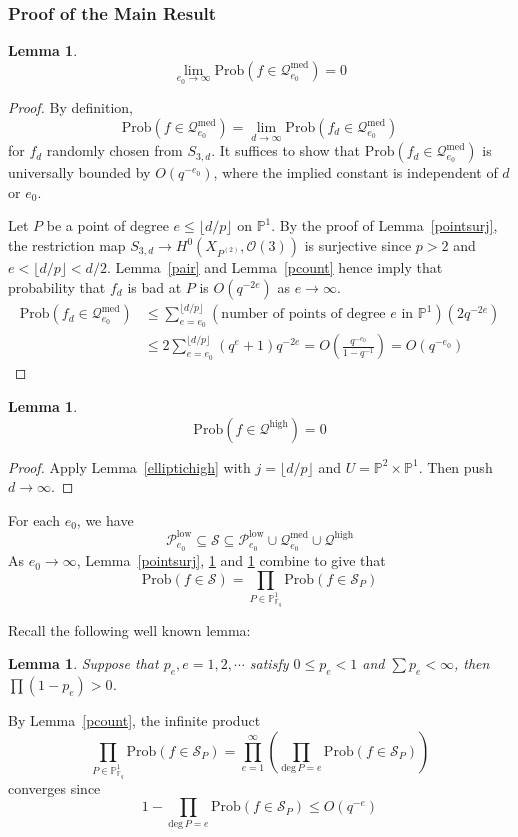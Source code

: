 \documentclass[12pt]{article}
\theoremstyle{plain}
\newtheorem{lemma}[equation]{Lemma}
\theoremstyle{definition}
\newcommand{\IF}{\mathbb{F}}
\newcommand{\IP}{\mathbb{P}}
\newcommand{\sO}{\mathcal{O}}
\newcommand{\sP}{\mathcal{P}}
\newcommand{\sQ}{\mathcal{Q}}
\newcommand{\sS}{\mathcal{S}}
\renewcommand{\deg}{\mathrm{deg}\,}
\newcommand{\<}{\langle}
\renewcommand{\>}{\rangle}
\newcommand{\Prob}{\mathrm{Prob}}
\newcommand{\fl}[1]{\lfloor #1 \rfloor}
\begin{document}
\subsubsection{Proof of the Main Result}
\begin{lemma}
\label{ellipticmed}
$$ \lim_{e_0 \to \infty} \Prob( f \in \sQ_{e_0}^{\mathrm{med}}) = 0 $$
\end{lemma}
\begin{proof}
By definition, 
$$ \Prob( f \in  \sQ_{e_0}^{\mathrm{med}}) = \lim_{d \to \infty} \Prob(f_d \in \sQ_{e_0}^{\mathrm{med}})$$
for $f_d$ randomly chosen from $S_{3, d}$. It suffices to show that $\Prob(f_d \in \sQ_{e_0}^{\mathrm{med}})$ is universally bounded by $O(q^{-e_0})$, where the implied constant is independent of $d$ or $e_0$. 

Let $P$ be a point of degree $e \le \lfloor d/p \rfloor$ on $\IP^1$. By the proof of Lemma~\ref{pointsurj}, the restriction map $S_{3, d} \to H^0(X_{P^{(2)}}, \sO(3))$ is surjective since $p > 2$ and $e < \lfloor d/p \rfloor < d/2$. Lemma~\ref{pair} and Lemma~\ref{pcount} hence imply that probability that $f_d$ is bad at $P$ is $O(q^{-2e})$ as $e \to \infty$. 
\begin{align*}
\Prob(f_d \in \sQ_{e_0}^{\mathrm{med}}) &\le \sum_{e = e_0}^{\lfloor d/p \rfloor} (\text{number of points of degree $e$ in $\IP^1$})(2q^{-2e}) \\
&\le 2 \sum_{e = e_0}^{\lfloor d/p \rfloor}(q^{e} + 1) q^{-2e} = O(\frac{q^{-e_0}}{1 - q^{-1}}) = O(q^{-e_0})
\end{align*} 
\end{proof}

\begin{lemma}
\label{elliptichighf}
$$ \Prob(f \in \sQ^{\mathrm{high}}) = 0 $$
\end{lemma}
\begin{proof}
Apply Lemma~\ref{elliptichigh} with $j = \fl{d/p}$ and $U = \IP^2 \times \IP^1$. Then push $d \to \infty$. 
\end{proof}

For each $e_0$, we have 
$$ \sP_{e_0}^{\mathrm{low}} \subseteq \sS \subseteq \sP_{e_0}^{\mathrm{low}} \cup \sQ_{e_0}^{\mathrm{med}} \cup \sQ^{\mathrm{high}}$$
As $e_0 \to \infty$, Lemma~\ref{pointsurj}, \ref{ellipticmed} and \ref{elliptichighf} combine to give that 
$$ \Prob(f \in \sS) = \prod_{P \in \IP^1_{\IF_q}} \Prob( f \in \sS_P) $$

Recall the following well known lemma:
\begin{lemma}
Suppose that $p_e, e = 1, 2, \cdots$ satisfy $0 \le p_e < 1$ and $\sum p_e < \infty$, then $\prod (1 - p_e) > 0$. 
\end{lemma}
By Lemma~\ref{pcount}, the infinite product 
$$ \prod_{P \in \IP^1_{\IF_q}} \Prob( f \in \sS_P) = \prod_{e = 1}^\infty (\prod_{\deg P = e} \Prob(f \in \sS_P))$$
converges since 
$$ 1 - \prod_{\deg P = e} \Prob(f \in \sS_P) \le O(q^{-e})$$
\end{document}
